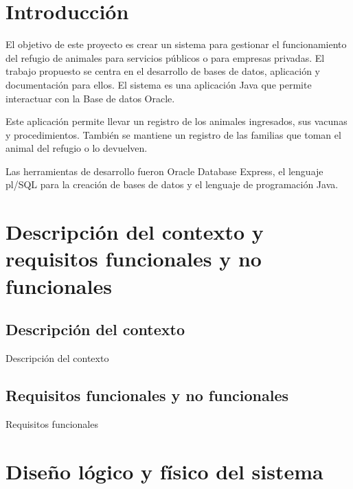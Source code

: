 \documentclass{FR16}
\begin{document}
\maketitle

\tableofcontents
\newpage

\section{Introducción}
El objetivo de este proyecto es crear un sistema para gestionar el funcionamiento del refugio de animales para servicios públicos o para empresas privadas. El trabajo propuesto se centra en el desarrollo de bases de datos, aplicación y documentación para ellos. El sistema es una aplicación Java que permite interactuar con la Base de datos Oracle.

Este aplicación permite llevar un registro de los animales ingresados, sus vacunas y procedimientos. También se mantiene un registro de las familias que toman el animal del refugio o lo devuelven.

Las herramientas de desarrollo fueron Oracle Database Express, el lenguaje pl/SQL para la creación de bases de datos y el lenguaje de programación Java.

\newpage

\section{Descripción del contexto y requisitos funcionales y no funcionales}
\subsection{Descripción del contexto}
\begin{center}
Descripción del contexto
\end{center}


\subsection{Requisitos funcionales y no funcionales}
\begin{center}
Requisitos funcionales
\end{center}

\newpage

\section{Diseño lógico y físico del sistema}
\end{document}
